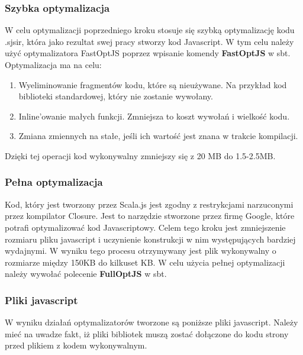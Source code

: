 \subsubsection{Szybka optymalizacja}

W celu optymalizacji poprzedniego kroku stosuje się szybką optymalizację kodu .sjsir, która jako rezultat swej pracy stworzy kod Javascript. W tym celu należy użyć optymalizatora FastOptJS poprzez wpisanie komendy \textbf{FastOptJS} w sbt. Optymalizacja ma na celu:
\begin{enumerate}
	\item Wyeliminowanie fragmentów kodu, które są nieużywane. Na przykład kod biblioteki standardowej, który nie zostanie wywołany.
	\item Inline'owanie małych funkcji. Zmniejsza to koszt wywołań i wielkość kodu.
	\item Zmiana zmiennych na stałe, jeśli ich wartość jest znana w trakcie kompilacji.
\end{enumerate}

Dzięki tej operacji kod wykonywalny zmniejszy się z 20 MB do 1.5-2.5MB\cite{ScalaCompilationProcess}.


\subsubsection{Pełna optymalizacja}

Kod, który jest tworzony przez Scala.js jest zgodny z restrykcjami narzuconymi przez kompilator Closure\cite{Closure}. Jest to narzędzie stworzone przez firmę Google, które potrafi optymalizować kod Javascriptowy.\cite{ClosureCompiler} Celem tego kroku jest zmniejszenie rozmiaru pliku javascript i uczynienie konstrukcji w nim występujących bardziej wydajnymi.
W wyniku tego procesu otrzymywany jest plik wykonywalny o rozmiarze między 150KB do kilkuset KB\cite{ScalaCompilationProcess}.
W celu użycia pełnej optymalizacji należy wywołać polecenie \textbf{FullOptJS} w sbt.

\subsubsection{Pliki javascript}

W wyniku działań optymalizatorów tworzone są poniższe pliki javascript. Należy mieć na uwadze fakt, iż pliki bibliotek muszą zostać dołączone do kodu strony przed plikiem z kodem wykonywalnym.

